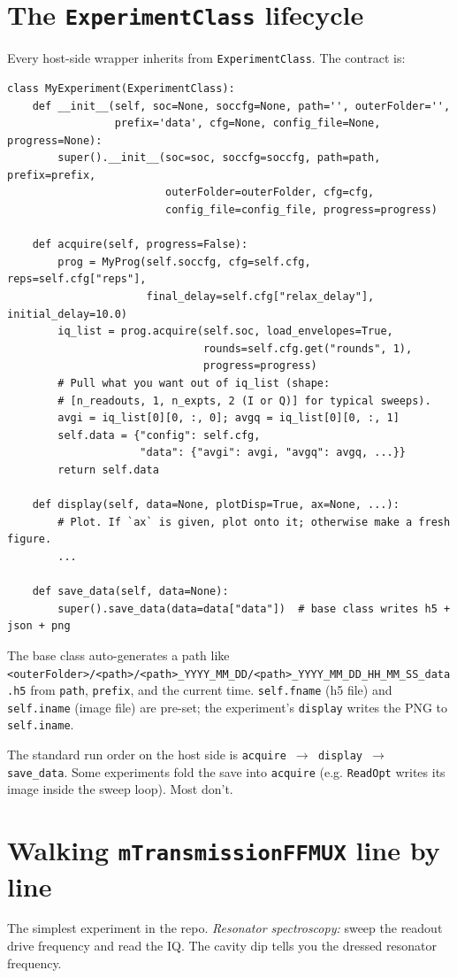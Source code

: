 \documentclass[11pt,letterpaper]{article}
\begin{document}
\section{The \texttt{ExperimentClass} lifecycle}
Every host-side wrapper inherits from \texttt{ExperimentClass}. The contract is:
\begin{lstlisting}
class MyExperiment(ExperimentClass):
    def __init__(self, soc=None, soccfg=None, path='', outerFolder='',
                 prefix='data', cfg=None, config_file=None, progress=None):
        super().__init__(soc=soc, soccfg=soccfg, path=path, prefix=prefix,
                         outerFolder=outerFolder, cfg=cfg,
                         config_file=config_file, progress=progress)

    def acquire(self, progress=False):
        prog = MyProg(self.soccfg, cfg=self.cfg, reps=self.cfg["reps"],
                      final_delay=self.cfg["relax_delay"], initial_delay=10.0)
        iq_list = prog.acquire(self.soc, load_envelopes=True,
                               rounds=self.cfg.get("rounds", 1),
                               progress=progress)
        # Pull what you want out of iq_list (shape:
        # [n_readouts, 1, n_expts, 2 (I or Q)] for typical sweeps).
        avgi = iq_list[0][0, :, 0]; avgq = iq_list[0][0, :, 1]
        self.data = {"config": self.cfg,
                     "data": {"avgi": avgi, "avgq": avgq, ...}}
        return self.data

    def display(self, data=None, plotDisp=True, ax=None, ...):
        # Plot. If `ax` is given, plot onto it; otherwise make a fresh figure.
        ...

    def save_data(self, data=None):
        super().save_data(data=data["data"])  # base class writes h5 + json + png
\end{lstlisting}
The base class auto-generates a path like \verb|<outerFolder>/<path>/<path>_YYYY_MM_DD/<path>_YYYY_MM_DD_HH_MM_SS_data.h5| from \texttt{path}, \texttt{prefix}, and the current time. \texttt{self.fname} (h5 file) and \texttt{self.iname} (image file) are pre-set; the experiment's \texttt{display} writes the PNG to \texttt{self.iname}.

The standard run order on the host side is \texttt{acquire $\rightarrow$ display $\rightarrow$ save\_data}. Some experiments fold the save into \texttt{acquire} (e.g. \texttt{ReadOpt} writes its image inside the sweep loop). Most don't.

\section{Walking \texttt{mTransmissionFFMUX} line by line}
The simplest experiment in the repo. \emph{Resonator spectroscopy:} sweep the readout drive frequency and read the IQ. The cavity dip tells you the dressed resonator frequency.
\end{document}
